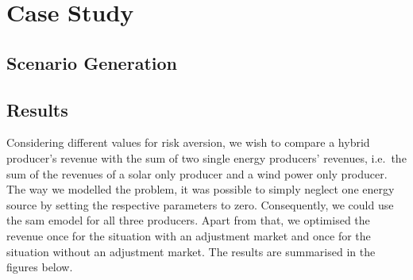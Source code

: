 \section{Case Study}

\subsection{Scenario Generation}




\subsection{Results}
Considering different values for risk aversion, we wish to compare a hybrid producer's revenue with the sum of two single energy producers' revenues, i.e.\ the sum of the revenues of a solar only producer and a wind power only producer. The way we modelled the problem, it was possible to simply neglect one energy source by setting the respective parameters to zero. Consequently, we could use the sam emodel for all three producers. Apart from that, we optimised the revenue once for the situation with an adjustment market and once for the situation without an adjustment market. The results are summarised in the figures below.  

